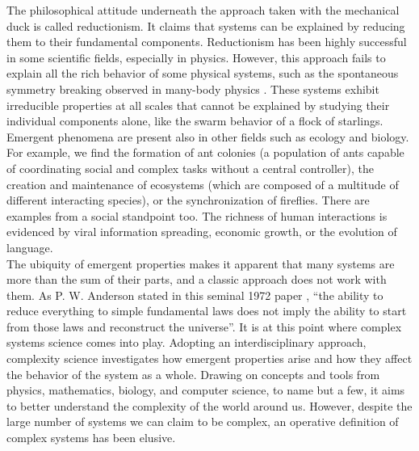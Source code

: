 The philosophical attitude underneath the approach taken with the mechanical duck is called reductionism. It claims that systems can be explained by reducing them to their fundamental components. Reductionism has been highly successful in some scientific fields, especially in physics. However, this approach fails to explain all the rich behavior of some physical systems, such as the spontaneous symmetry breaking observed in many-body physics \cite{anderson1972more}. These systems exhibit irreducible properties at all scales that cannot be explained by studying their individual components alone, like the swarm behavior of a flock of starlings. Emergent phenomena are present also in other fields such as ecology and biology. For example, we find the formation of ant colonies (a population of ants capable of coordinating social and complex tasks without a central controller), the creation and maintenance of ecosystems (which are composed of a multitude of different interacting species), or the synchronization of fireflies. There are examples from a social standpoint too. The richness of human interactions is evidenced by viral information spreading, economic growth, or the evolution of language. \\

The ubiquity of emergent properties makes it apparent that many systems are more than the sum of their parts, and a classic approach does not work with them. As P. W. Anderson stated in this seminal 1972 paper \cite{anderson1972more}, ``the ability to reduce everything to simple fundamental laws does not imply the ability to start from those laws and reconstruct the universe''. It is at this point where complex systems science comes into play. Adopting an interdisciplinary approach, complexity science investigates how emergent properties arise and how they affect the behavior of the system as a whole. Drawing on concepts and tools from physics, mathematics, biology, and computer science, to name but a few, it aims to better understand the complexity of the world around us. However, despite the large number of systems we can claim to be complex, an operative definition of complex systems has been elusive. \\

